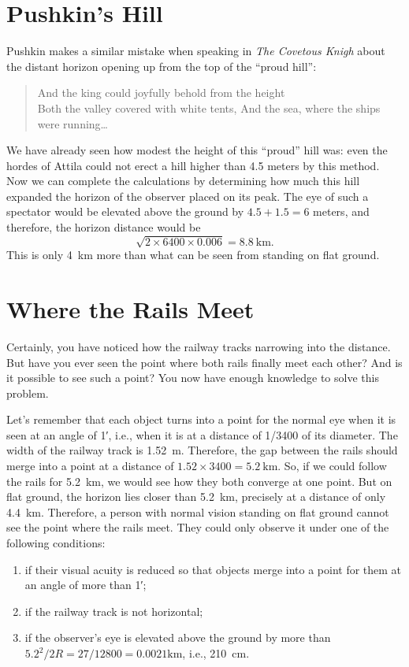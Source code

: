 \section{Pushkin's Hill}

Pushkin makes a similar mistake when speaking in \emph{The Covetous Knigh} about the distant horizon opening up from the top of the ``proud hill'':
\begin{quote}
And the king could joyfully behold from the height\\
Both the valley covered with white tents, And the sea, where the ships were running\dots{}
\end{quote}
We have already seen how modest the height of this ``proud'' hill was: even the hordes of Attila could not erect a hill higher than 4.5 meters by this method. Now we can complete the calculations by determining how much this hill expanded the horizon of the observer placed on its peak. The eye of such a spectator would be elevated above the ground by $4.5 + 1.5 = 6$ meters, and therefore, the horizon distance would be 
\begin{equation*}%
\sqrt{2 \times 6400 \times 0.006} = \SI{8.8}{\kilo\meter}.
\end{equation*}
This is only \SI{4}{\kilo\meter} more than what can be seen from standing on flat ground.


\section{Where the Rails Meet}
\label{sec-6.6}

\ques Certainly, you have noticed how the railway tracks narrowing into the distance. But have you ever seen the point where both rails finally meet each other? And is it possible to see such a point? You now have enough knowledge to solve this problem.

\ans Let's remember that each object turns into a point for the normal eye when it is seen at an angle of \ang{;1}, i.e., when it is at a distance of 1/3400 of its diameter. The width of the railway track is \SI{1.52}{\meter}. Therefore, the gap between the rails should merge into a point at a distance of $1.52 \times 3400 = \SI{5.2}{\kilo\meter}$. So, if we could follow the rails for \SI{5.2}{\kilo\meter}, we would see how they both converge at one point. But on flat ground, the horizon lies closer than \SI{5.2}{\kilo\meter}, precisely at a distance of only \SI{4.4}{\kilo\meter}. Therefore, a person with normal vision standing on flat ground cannot see the point where the rails meet. They could only observe it under one of the following conditions:
\begin{enumerate}
\item if their visual acuity is reduced so that objects merge into a point for them at an angle of more than \ang{;1};
\item if the railway track is not horizontal;
\item if the observer's eye is elevated above the ground by more than $5.2^{2}/2R = 27/12800 = 0.0021\si{\kilo\meter}$, i.e., \SI{210}{\centi\meter}.
\end{enumerate}

